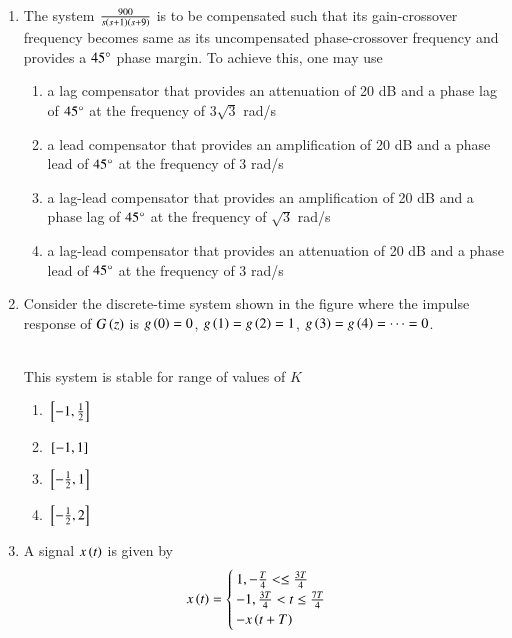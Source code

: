 \documentclass[journal]{IEEEtran}
\begin{document}
\begin{enumerate}
\item The system $\frac{900}{s\left(s+1\right)\left(s+9\right)}$ is to be compensated such that its gain-crossover frequency becomes same as its uncompensated phase-crossover frequency and provides a $45\degree$ phase margin. To achieve this, one may use
    \begin{enumerate}
        \item a lag compensator that provides an attenuation of 20 dB and a phase lag of $45\degree$ at the frequency of $3\sqrt{3}$ rad/s
        \item a lead compensator that provides an amplification of 20 dB and a phase lead of $45\degree$ at the frequency of 3 rad/s
        \item a lag-lead compensator that provides an amplification of 20 dB and a phase lag of $45\degree$ at the frequency of $\sqrt{3}$ rad/s
        \item a lag-lead compensator that provides an attenuation of 20 dB and a phase lead of $45\degree$ at the frequency of 3 rad/s \\
    \end{enumerate}
\item Consider the discrete-time system shown in the figure where the impulse response of $G\left(z\right)$ is $g\left(0\right)=0$, $g\left(1\right)=g\left(2\right)=1$, $g\left(3\right)=g\left(4\right)=\cdots=0$.
\begin{figure}[!ht]
    \centering
    \resizebox{0.5\textwidth}{!}{%
    
    }%
  \end{figure}\\
     This system is stable for range of values of $K$
\begin{enumerate}
    \item ${}\left[-1, \frac{1}{2}\right]$
    \item ${}\left[-1, 1\right]$
    \item ${}\left[-\frac{1}{2}, 1\right]$
    \item ${}\left[-\frac{1}{2}, 2\right]$ \\
\end{enumerate}
\item A signal $x\left(t\right)$ is given by 
\begin{align*}
    x\brak{t} = 
    \begin{cases}
        1, -\frac{T}{4} <  \leq \frac{3T}{4} \\
        -1, \frac{3T}{4} < t \leq \frac{7T}{4} \\
        -x\brak{t + T}
    \end{cases}

\end{align*}
\end{enumerate}
\end{document}
